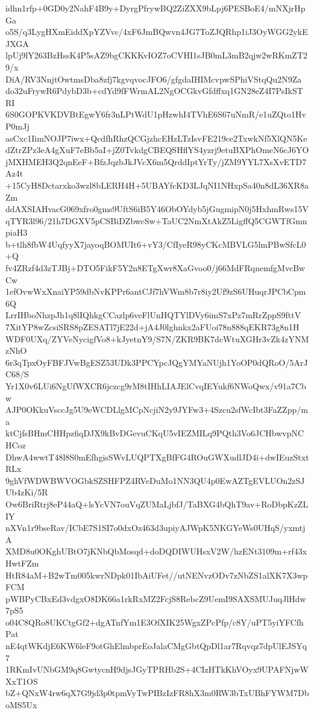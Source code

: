 idhn1rfp+0GD0y2NahF4B9y+DyrgPfrywBQ2ZiZXX9bLpj6PESBoE4/mNXjrHpGa
o5S/q3LygHXmEiddXpYZVvc/4xF6JmBQwvn4JG7ToZJQRhp1iJ3OyWGG2ykEJXGA
lpUj9lY263BzHssK4P5sAZ9bgCKKKvIOZ7oCVHI1sJB0mL3mB2qjw2wRKmZT29/x
DiA/RV3NnjtOwtmsDba8zfj7kgvqvocJFO6/gfgdaIHIMcvpwSPhiVStqQu2N9Za
do32uFrywR6PdybD3b+cdYd9fFWrmAL2NgOCGkvGfdffxq1GN28eZ4I7PsIkSTRI
6S0GOPKVKDVBtEgwY6fr3nLPtWdU1pHzwhI4TVhE6S67uNmR/e1uZQto1HvP0mJj
asCxc1IimNOJP7iwx+QcdfhRhzQCGjzhcEHzLTzIsvFE219ce2TxwkNf5XlQN5Ke
dZtrZPz3eA4gXuF7eBb5aI+jZ0TvkdgCBEQSHflYS4yzrj9etuBXPhOmeN6cJ6YO
jMXHMEH3Q2qnEeF+BfzJqzbJkJVcX6m5QrddIptYrTy/jZM9YYL7XsXvETD7Az4t
+15CyH8Dctarxko3wzl8bLERH4H+5UBAYfcKD3LJqNI1NHxpSa40n8dL36XR8aZm
ddAXSIAHvacG069xfro0gms9UftS6iB5Y46ObOYdyb5jGugmipN0j5HxhmRws15V
qTYR3l96/21h7DGXV5pCSBiDZbwcSw+TaUC2NmXtAkZ5LigffQ5CGWTfGmnpiaH3
b+tlh8fbW4UqfyyX7jayoqBOMUIt6+vY3/CfIyeR98yCKcMBVLG5lmPBwSfcL0+Q
fv4ZRzf4d3zTJBj+DTO5FikF5Y2n8ETgXwr8XaGvoo0/j66MdFRqnemfgMvcBwCw
1efOvwWxXnaiYP59dbNvKPPr6antCJf7hVWm8b7r8iy2Uf9zS6UHuqrJPCbCpm6Q
LrrIHboNhzpJh1q8lIQhkgCCazlp6veFlUnHQTYlDVy6imS7xPz7mRrZppS9fttV
7XitYP8wZcsiSRS8pZESATl7jE22d+jA4J0lghnkx2aFUoi78n888qEKR73g8n1H
WDF0UXq/ZYVeNycigfVo8+kJyetnY9/S7N/ZKR9BK7dcWtuXGHr3vZk4zYNMzNhO
6r3qTpxOyFBFJVwBgESZ53UDk3PPCYpcJQgYMYaNUjh1YoOP0dQRoO/5ArJC68/S
Yr1X0v6LUi6NgUfWXCR6jczcg9rM8tIHhLIAJElCvqIEYukf6NWoQwx/v91a7Cbw
AJP0OKkuVsccJg5U9eWCDLlgMCpNcjiN2y9JYFw3+4Szcu2sfWcIbt3FaZZpp/ma
ktCjfsBHmCHHpzfiqDJX9kBvDGevuCKqU5vIEZMILq9PQth3Vo6JCHbwvpNCHCoz
DhwA4wwtT48l8S0mEfhgisSWvLUQPTXgBfFG4ROuGWXudlJD4i+dwIEuzStxtRLx
9ghVfWDWBWVOGbkSZSHFPZ4RVeDuMo1NN3QU4p0EwAZTgEVLUOn2zSJUb4zKi/5R
Ow6BriRtrj8eP44aQ+lsYcVN7ouVqZUMaLjbfJ/TaBXG4bQhT9av+RoDbpKzZLIY
nXVn1r9bseRav/ICbE7S1SI7o0dxOz463d3upiyAJWpK5NKGYeWs0UHqS/yxmtjA
XMD8u0OKghUBtO7jKNbQbMosqd+doDQDIWUHsxV2W/hzENt3109m+rf43xHwtFZm
HtR84aM+B2wTm005kwrNDpk01IbAiUFet//utNENvzODv7zNbZS1alXK7X3wpFCM
pWBPyCBxEd3vdgxO8DK66a1rkRxMZ2FcjS8RebcZ9UemI9SAXSMUJuqJlHdw7pS5
o04C8QRo8UKCtgGf2+dgATnfYm1E3OfXIK25WgxZPcPfp/c8Y/uPT5yiYFCfhPat
nE4qtWKdjE6KW6leF9otGhElmbprEoJalaCMgGbtQpDl1ar7Rqvqz7dpUlEJSYq7
1RKmIvUNbGM9q8GwtycnH9djsJGyTPRHb2S+4CIzHTkKhVOyx9UPAFNjwWXxT1OS
bZ+QNxW4rw6qX7G9jd3p0tpmVyTwPIBzIzFR8hX3m0RW3bTxUBhFYWM7DboMS5Ux
